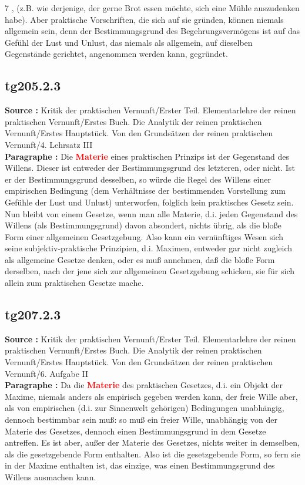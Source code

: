 \documentclass[a4paper,12pt,twoside]{book}
\newcommand{\match}[1]{\textcolor{red}{\textbf{#1}}}
\begin{document}
	
	7
	, (z.B. wie derjenige, der gerne Brot essen möchte, sich eine Mühle auszudenken habe). Aber praktische Vorschriften, die sich auf sie gründen, können niemals allgemein sein, denn der Bestimmungsgrund des Begehrungsvermögens ist auf das Gefühl der Lust und Unlust, das niemals als allgemein, auf dieselben Gegenstände gerichtet, angenommen werden kann, gegründet. 
	
	\subsection*{tg205.2.3} 
	\textbf{Source : }Kritik der praktischen Vernunft/Erster Teil. Elementarlehre der reinen praktischen Vernunft/Erstes Buch. Die Analytik der reinen praktischen Vernunft/Erstes Hauptstück. Von den Grundsätzen der reinen praktischen Vernunft/4. Lehrsatz III\\  
	
	\noindent\textbf{Paragraphe : }Die \match{Materie} eines praktischen Prinzips ist der Gegenstand des Willens. Dieser ist entweder der Bestimmungsgrund des letzteren, oder nicht. Ist er der Bestimmungsgrund desselben, so würde die Regel des Willens einer empirischen Bedingung (dem Verhältnisse der bestimmenden Vorstellung zum Gefühle der Lust und Unlust) unterworfen, folglich kein praktisches Gesetz sein. Nun bleibt von einem  Gesetze, wenn man alle Materie, d.i. jeden Gegenstand des Willens (als Bestimmungsgrund) davon absondert, nichts übrig, als die bloße Form einer allgemeinen Gesetzgebung. Also kann ein vernünftiges Wesen sich seine subjektiv-praktische Prinzipien, d.i. Maximen, entweder gar nicht zugleich als allgemeine Gesetze denken, oder es muß annehmen, daß die bloße Form derselben, nach der jene sich zur allgemeinen Gesetzgebung schicken, sie für sich allein zum praktischen Gesetze mache. 
	
	\subsection*{tg207.2.3} 
	\textbf{Source : }Kritik der praktischen Vernunft/Erster Teil. Elementarlehre der reinen praktischen Vernunft/Erstes Buch. Die Analytik der reinen praktischen Vernunft/Erstes Hauptstück. Von den Grundsätzen der reinen praktischen Vernunft/6. Aufgabe II\\  
	
	\noindent\textbf{Paragraphe : }Da die \match{Materie} des praktischen Gesetzes, d.i. ein Objekt der Maxime, niemals anders als empirisch gegeben werden kann, der freie Wille aber, als von empirischen (d.i. zur Sinnenwelt gehörigen) Bedingungen unabhängig, dennoch bestimmbar sein muß: so muß ein freier Wille, unabhängig von der Materie des Gesetzes, dennoch einen Bestimmungsgrund in dem Gesetze antreffen. Es ist aber, außer der Materie des Gesetzes, nichts weiter in demselben, als die gesetzgebende Form enthalten. Also ist die gesetzgebende Form, so fern sie in der Maxime enthalten ist, das einzige, was einen Bestimmungsgrund des Willens ausmachen kann. 
	
\end{document}

